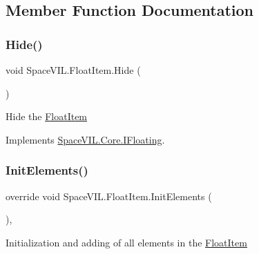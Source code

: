 \subsection{Member Function Documentation}
\mbox{\label{class_space_v_i_l_1_1_float_item_a7087e7124eae00d372a68b9966a2548d}} 
\subsubsection{\texorpdfstring{Hide()}{Hide()}}
{\footnotesize\ttfamily void Space\+V\+I\+L.\+Float\+Item.\+Hide (\begin{DoxyParamCaption}{ }\end{DoxyParamCaption})\hspace{0.3cm}{\ttfamily [inline]}}



Hide the \mbox{\hyperlink{class_space_v_i_l_1_1_float_item}{Float\+Item}} 



Implements \mbox{\hyperlink{interface_space_v_i_l_1_1_core_1_1_i_floating}{Space\+V\+I\+L.\+Core.\+I\+Floating}}.

\mbox{\label{class_space_v_i_l_1_1_float_item_adf2e88b89c3ce9ec105fae8ac66390e4}} 
\subsubsection{\texorpdfstring{Init\+Elements()}{InitElements()}}
{\footnotesize\ttfamily override void Space\+V\+I\+L.\+Float\+Item.\+Init\+Elements (\begin{DoxyParamCaption}{ }\end{DoxyParamCaption})\hspace{0.3cm}{\ttfamily [inline]}, {\ttfamily [virtual]}}



Initialization and adding of all elements in the \mbox{\hyperlink{class_space_v_i_l_1_1_float_item}{Float\+Item}} 



